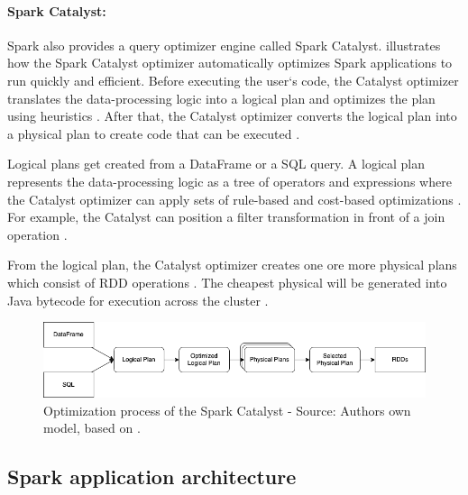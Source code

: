 \paragraph{Spark Catalyst:}
Spark also provides a query optimizer engine called Spark Catalyst.  illustrates how the Spark Catalyst optimizer automatically optimizes Spark applications to run quickly and efficient.
Before executing the user`s code, the Catalyst optimizer translates the data-processing logic into a logical plan and optimizes the plan using heuristics \cite{Hien2018Spark}. After that, the Catalyst optimizer converts the logical plan into a physical plan to create code that can be executed \cite{Hien2018Spark}.


Logical plans get created from a DataFrame or a SQL query. A logical plan represents the data-processing logic as a tree of operators and expressions where the Catalyst optimizer can apply sets of rule-based and cost-based optimizations \cite{Hien2018Spark}.
For example, the Catalyst can position a filter transformation in front of a join operation \cite{Hien2018Spark}.

From the logical plan, the Catalyst optimizer creates one ore more physical plans which consist of RDD operations \cite{Chambers2018Spark}. The cheapest physical will be generated into Java bytecode for execution across the cluster \cite{Hien2018Spark}.

\begin{figure}[h]%
\centering
\includegraphics[scale=0.5]{images/04_technical_background/spark_catalyst}%
\caption{Optimization process of the Spark Catalyst - Source: Authors own model, based on \cite{Hien2018Spark}.}%
\label{fig:spark_catalyst_process}%
\end{figure}


\subsection{Spark application architecture}


